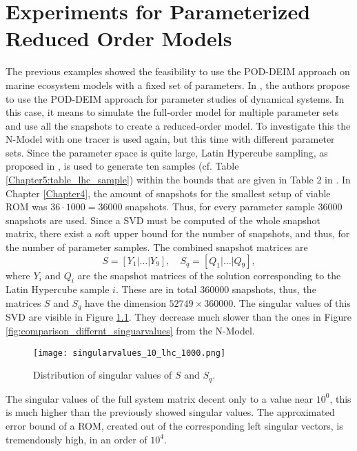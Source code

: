 
\chapter{Experiments for Parameterized Reduced Order Models} 
\label{Chapter5}

The previous examples showed the feasibility to use the POD-DEIM approach on marine ecosystem models with a fixed 
set of parameters. In \cite{PODDeimapplication}, the authors propose to use the POD-DEIM approach for parameter studies of dynamical 
systems. In this case, it means to simulate the full-order model for multiple parameter sets and
use all the snapshots to create a reduced-order model. To investigate this the N-Model with one tracer is used again, but this time with different parameter sets. Since the parameter space is quite large, 
Latin Hypercube sampling, as proposed in \cite{ROM_book2}, is used to generate ten samples (cf. Table \ref{Chapter5:table_lhc_sample}) within the bounds
that are given in Table 2 in \cite{metos3dsimpack}. In Chapter \ref{Chapter4}, the amount of snapshots for the smallest setup of viable ROM was $36 \cdot 1000= 36000$ snapshots.
Thus, for every parameter sample 36000 snapshots are used. Since a SVD must be computed of the whole 
snapshot matrix, there exist a soft upper bound for the number of snapshots, and thus, for the number of parameter samples.
The combined snapshot matrices are
\begin{equation*}
 S =[Y_1|\dots|Y_9], \quad S_q = [Q_1|\dots|Q_9],
\end{equation*}
where $Y_i$ and $Q_i$ are the snapshot matrices of the solution corresponding to the Latin Hypercube sample $i$.
These are in total 360000 snapshots, thus, the matrices $S$ and $S_q$ have the dimension $52749 \times 360000$.
The singular values of this SVD are visible in Figure \ref{fig:singularvalues_10_lhc}. They decrease much slower than the ones in Figure \ref{fig:comparison_differnt_singuarvalues} from the N-Model.
\begin{figure}[ht]
\centering
  \texttt{[image: singularvalues\_10\_lhc\_1000.png]}
  \caption{Distribution of singular values of $S$ and $S_q$.}
  \label{fig:singularvalues_10_lhc}
\end{figure}
The singular values of the full system matrix decent only to a value near $10^0$, this is much higher than the previously showed singular values.
The approximated error bound of a ROM, created out of the corresponding left singular vectors, is tremendously high, in an order of $10^4$.
